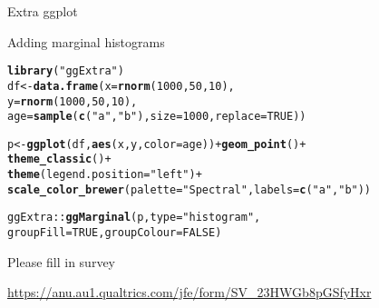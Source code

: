\documentclass[10pt]{beamer}\usepackage[]{graphicx}\usepackage[]{color}
\makeatletter
\newcommand{\hlnum}[1]{\textcolor[rgb]{0.686,0.059,0.569}{#1}}%
\newcommand{\hlstr}[1]{\textcolor[rgb]{0.192,0.494,0.8}{#1}}%
\newcommand{\hlopt}[1]{\textcolor[rgb]{0,0,0}{#1}}%
\newcommand{\hlstd}[1]{\textcolor[rgb]{0.345,0.345,0.345}{#1}}%
\newcommand{\hlkwb}[1]{\textcolor[rgb]{0.69,0.353,0.396}{#1}}%
\newcommand{\hlkwc}[1]{\textcolor[rgb]{0.333,0.667,0.333}{#1}}%
\newcommand{\hlkwd}[1]{\textcolor[rgb]{0.737,0.353,0.396}{\textbf{#1}}}%
\newenvironment{kframe}{%
 \def\at@end@of@kframe{}%
 \ifinner\ifhmode%
  \def\at@end@of@kframe{\end{minipage}}%
  \begin{minipage}{\columnwidth}%
 \fi\fi%
 \def\FrameCommand##1{\hskip\@totalleftmargin \hskip-\fboxsep
 \colorbox{shadecolor}{##1}\hskip-\fboxsep
     \hskip-\linewidth \hskip-\@totalleftmargin \hskip\columnwidth}%
 \MakeFramed {\advance\hsize-\width
   \@totalleftmargin\z@ \linewidth\hsize
   \@setminipage}}%
 {\par\unskip\endMakeFramed%
 \at@end@of@kframe}
\newenvironment{knitrout}{}{} %
\makeatother
\begin{document}
\begin{frame}[fragile]{Extra ggplot}

Adding marginal histograms 

\begin{knitrout}
\color{fgcolor}\begin{kframe}
\begin{alltt}
\hlkwd{library}\hlstd{(}\hlstr{"ggExtra"}\hlstd{)}
\hlstd{df} \hlkwb{<-} \hlkwd{data.frame}\hlstd{(}\hlkwc{x} \hlstd{=} \hlkwd{rnorm}\hlstd{(}\hlnum{1000}\hlstd{,} \hlnum{50}\hlstd{,} \hlnum{10}\hlstd{),}
                 \hlkwc{y} \hlstd{=} \hlkwd{rnorm}\hlstd{(}\hlnum{1000}\hlstd{,} \hlnum{50}\hlstd{,} \hlnum{10}\hlstd{),}
    \hlkwc{age} \hlstd{=} \hlkwd{sample}\hlstd{(}\hlkwd{c}\hlstd{(}\hlstr{"a"}\hlstd{,}\hlstr{"b"}\hlstd{),} \hlkwc{size} \hlstd{=} \hlnum{1000}\hlstd{,} \hlkwc{replace} \hlstd{=} \hlnum{TRUE}\hlstd{))}

\hlstd{p} \hlkwb{<-} \hlkwd{ggplot}\hlstd{(df,} \hlkwd{aes}\hlstd{(x, y,} \hlkwc{color}\hlstd{=age))} \hlopt{+} \hlkwd{geom_point}\hlstd{()} \hlopt{+}
  \hlkwd{theme_classic}\hlstd{()}\hlopt{+}
  \hlkwd{theme}\hlstd{(}\hlkwc{legend.position}\hlstd{=}\hlstr{"left"}\hlstd{)}\hlopt{+}
  \hlkwd{scale_color_brewer}\hlstd{(}\hlkwc{palette} \hlstd{=} \hlstr{"Spectral"}\hlstd{,} \hlkwc{labels}\hlstd{=}\hlkwd{c}\hlstd{(}\hlstr{"a"}\hlstd{,}\hlstr{"b"}\hlstd{))}

\hlstd{ggExtra}\hlopt{::}\hlkwd{ggMarginal}\hlstd{(p,} \hlkwc{type} \hlstd{=} \hlstr{"histogram"}\hlstd{,}
                \hlkwc{groupFill}\hlstd{=}\hlnum{TRUE}\hlstd{,} \hlkwc{groupColour} \hlstd{=} \hlnum{FALSE}\hlstd{)}
\end{alltt}
\end{kframe}
\end{knitrout}

\end{frame}


\begin{frame}{Please fill in survey}

\url{https://anu.au1.qualtrics.com/jfe/form/SV_23HWGb8pGSfyHxr}

\end{frame}
\end{document}
